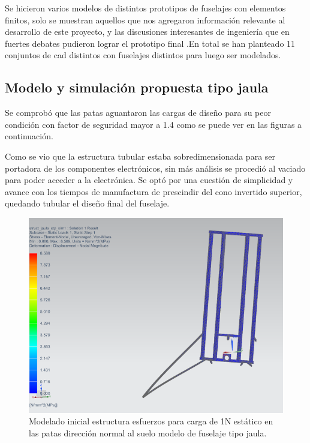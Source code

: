 \medskip

Se hicieron varios modelos de distintos prototipos de fuselajes con elementos finitos, solo se muestran aquellos que nos agregaron información relevante al desarrollo de este proyecto, y las discusiones interesantes de ingeniería que en fuertes debates pudieron lograr el prototipo final .En total se han planteado 11 conjuntos de cad distintos con fuselajes distintos para luego ser modelados.

\null\newpage
\clearpage

\subsection{Modelo y simulación propuesta tipo jaula}
Se comprobó que las patas aguantaron las cargas de diseño para su peor condición con factor de seguridad mayor a 1.4 como se puede ver en las figuras a continuación.

Como se vio que la estructura tubular estaba sobredimensionada para ser portadora de los componentes electrónicos, sin más análisis se procedió al vaciado para poder acceder a la electrónica. Se optó por una cuestión de simplicidad y avance con los tiempos de manufactura de prescindir del cono invertido superior, quedando tubular el diseño final del fuselaje. 



\begin{figure}[htb]
    \centering
    \includegraphics[height=0.3\pdfpageheight]{fig/fea/jaula.png}
    \caption{Modelado inicial estructura esfuerzos para carga de 1N estático en las patas dirección normal al suelo modelo de fuselaje tipo jaula.}
    \label{fig:fea/jaula}
\end{figure}


